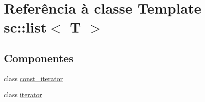 \hypertarget{classsc_1_1list}{}\section{Referência à classe Template sc\+:\+:list$<$ T $>$}
\label{classsc_1_1list}
\subsection*{Componentes}
\begin{DoxyCompactItemize}
\item 
class \hyperlink{classsc_1_1list_1_1const__iterator}{const\+\_\+iterator}
\item 
class \hyperlink{classsc_1_1list_1_1iterator}{iterator}
\end{DoxyCompactItemize}
